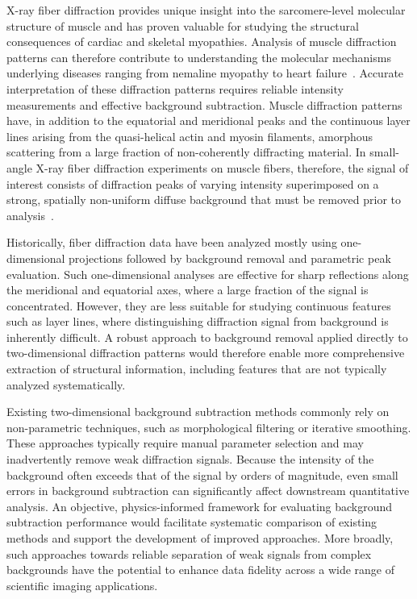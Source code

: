 \documentclass[11pt,onecolumn]{IEEEtran}
\begin{document}
X-ray fiber diffraction provides unique insight into the sarcomere-level molecular structure of muscle and has proven valuable for studying the structural consequences of cardiac and skeletal myopathies. Analysis of muscle diffraction patterns can therefore contribute to understanding the molecular mechanisms underlying diseases ranging from nemaline myopathy to heart failure~\cite{MaIrving2022}. Accurate interpretation of these diffraction patterns requires reliable intensity measurements and effective background subtraction. Muscle diffraction patterns have, in addition to the equatorial and meridional peaks and the continuous layer lines arising from the quasi-helical actin and myosin filaments, amorphous scattering from a large fraction of non-coherently diffracting material. In small-angle X-ray fiber diffraction experiments on muscle fibers, therefore, the signal of interest consists of diffraction peaks of varying intensity superimposed on a strong, spatially non-uniform diffuse background that must be removed prior to analysis~\cite{squire2003ccp13_software}.

Historically, fiber diffraction data have been analyzed mostly using one-dimensional projections followed by background removal and parametric peak evaluation. Such one-dimensional analyses are effective for sharp reflections along the meridional and equatorial axes, where a large fraction of the signal is concentrated. However, they are less suitable for studying continuous features such as layer lines, where distinguishing diffraction signal from background is inherently difficult. A robust approach to background removal applied directly to two-dimensional diffraction patterns would therefore enable more comprehensive extraction of structural information, including features that are not typically analyzed systematically.

Existing two-dimensional background subtraction methods commonly rely on non-parametric techniques, such as morphological filtering or iterative smoothing. These approaches typically require manual parameter selection and may inadvertently remove weak diffraction signals. Because the intensity of the background often exceeds that of the signal by orders of magnitude, even small errors in background subtraction can significantly affect downstream quantitative analysis. An objective, physics-informed framework for evaluating background subtraction performance would facilitate systematic comparison of existing methods and support the development of improved approaches. More broadly, such approaches towards reliable separation of weak signals from complex backgrounds have the potential to enhance data fidelity across a wide range of scientific imaging applications.
\end{document}
